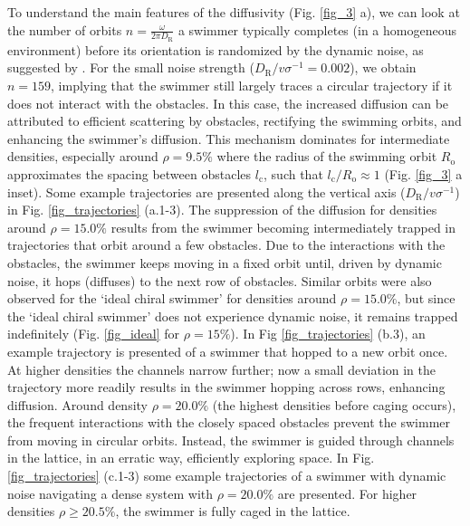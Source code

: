 \documentclass[aps,pre,twocolumn,showpacs,superscriptaddress,amsmath,amssymb,longbibliography]{revtex4-2}
\begin{document}
To understand the main features of the diffusivity (Fig. \ref{fig_3} a), we can look at the number of orbits $n = \frac{\omega}{2\pi D_{\textrm{R}}}$ a swimmer typically completes (in a homogeneous environment) before its orientation is randomized by the dynamic noise, as suggested by \cite{franosh2}. For the small noise strength ($D_{\textrm{R}}/v\sigma^{-1}=0.002$), we obtain $n =159$, implying that the swimmer still largely traces a circular trajectory if it does not interact with the obstacles. In this case, the increased diffusion can be attributed to efficient scattering by obstacles, rectifying the swimming orbits, and enhancing the swimmer's diffusion. This mechanism dominates for intermediate densities, especially around $\rho = 9.5\%$ where the radius of the swimming orbit $R_{\textrm{o}}$ approximates the spacing between obstacles $l_{\textrm{c}}$, such that $l_{\textrm{c}}/R_{\textrm{o}} \approx 1$ (Fig. \ref{fig_3} a inset). Some example trajectories are presented along the vertical axis ($D_{\textrm{R}}/v\sigma^{-1}$) in Fig. \ref{fig_trajectories} (a.1-3). The suppression of the diffusion for densities around $\rho = 15.0\%$ results from the swimmer becoming intermediately trapped in trajectories that orbit around a few obstacles. Due to the interactions with the obstacles, the swimmer keeps moving in a fixed orbit until, driven by dynamic noise, it hops (diffuses) to the next row of obstacles. Similar orbits were also observed for the `ideal chiral swimmer' for densities around  $\rho = 15.0 \%$, but since the `ideal chiral swimmer' does not experience dynamic noise, it remains trapped indefinitely (Fig. \ref{fig_ideal} for $\rho = 15 \%$). In Fig \ref{fig_trajectories} (b.3), an example trajectory is presented of a swimmer that hopped to a new orbit once. At higher densities the channels narrow further; now a small deviation in the trajectory more readily results in the swimmer hopping across rows, enhancing diffusion.
Around density $\rho = 20.0 \%$ (the highest densities before caging occurs), the frequent interactions with the closely spaced obstacles prevent the swimmer from moving in circular orbits. Instead, the swimmer is guided through channels in the lattice, in an erratic way, efficiently exploring space. In Fig. \ref{fig_trajectories} (c.1-3) some example trajectories of a swimmer with dynamic noise navigating a dense system with $\rho = 20.0 \%$ are presented. For higher densities $\rho \geq 20.5 \%$, the swimmer is fully caged in the lattice.
\end{document}
